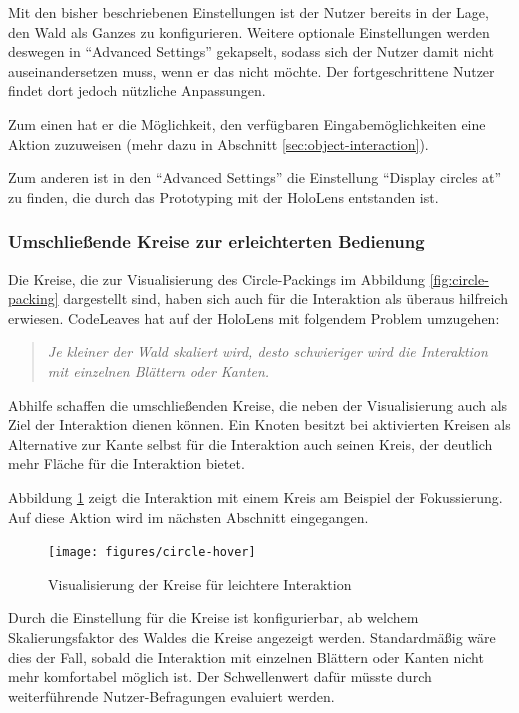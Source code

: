 Mit den bisher beschriebenen Einstellungen ist der Nutzer bereits in der Lage, den Wald als Ganzes zu konfigurieren. Weitere optionale Einstellungen werden deswegen in "`Advanced Settings"' gekapselt, sodass sich der Nutzer damit nicht auseinandersetzen muss, wenn er das nicht möchte. Der fortgeschrittene Nutzer findet dort jedoch nützliche Anpassungen.

Zum einen hat er die Möglichkeit, den verfügbaren Eingabemöglichkeiten eine Aktion zuzuweisen (mehr dazu in Abschnitt \ref{sec:object-interaction}).

Zum anderen ist in den "`Advanced Settings"' die Einstellung "`Display circles at"' zu finden, die durch das Prototyping mit der HoloLens entstanden ist.

\subsubsection*{Umschließende Kreise zur erleichterten Bedienung}
Die Kreise, die zur Visualisierung des Circle-Packings im Abbildung \ref{fig:circle-packing} dargestellt sind, haben sich auch für die Interaktion als überaus hilfreich erwiesen. CodeLeaves hat auf der HoloLens mit folgendem Problem umzugehen:

\begin{quote}
  \textit{Je kleiner der Wald skaliert wird, desto schwieriger wird die Interaktion mit einzelnen Blättern oder Kanten.}
\end{quote}

Abhilfe schaffen die umschließenden Kreise, die neben der Visualisierung auch als Ziel der Interaktion dienen können. Ein Knoten besitzt bei aktivierten Kreisen als Alternative zur Kante selbst für die Interaktion auch seinen Kreis, der deutlich mehr Fläche für die Interaktion bietet.

Abbildung \ref{fig:circle-hover} zeigt die Interaktion mit einem Kreis am Beispiel der Fokussierung. Auf diese Aktion wird im nächsten Abschnitt eingegangen.

\begin{figure}[htb]
  \texttt{[image: figures/circle-hover]}
  \caption{Visualisierung der Kreise für leichtere Interaktion}
  \label{fig:circle-hover}
\end{figure}

Durch die Einstellung für die Kreise ist konfigurierbar, ab welchem Skalierungsfaktor des Waldes die Kreise angezeigt werden. Standardmäßig wäre dies der Fall, sobald die Interaktion mit einzelnen Blättern oder Kanten nicht mehr komfortabel möglich ist. Der Schwellenwert dafür müsste durch weiterführende Nutzer-Befragungen evaluiert werden.

